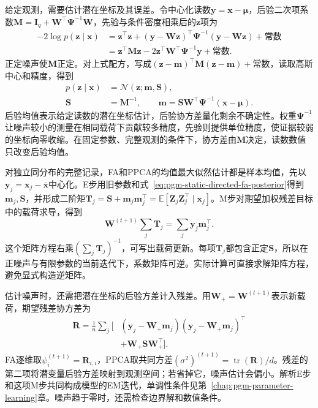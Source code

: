 给定观测，需要估计潜在坐标及其误差。令中心化读数$\bm y=\bm x-\bm\mu$，后验二次项系数$\bm M=\bm I_q+\bm W^\top\bm\Psi^{-1}\bm W$，先验与条件密度相乘后的$\bm z$项为
\[
  \begin{aligned}
    -2\log p(\bm{z}\mid\bm{x})
      &=\bm{z}^{\top}\bm{z}
       +(\bm{y}-\bm{W}\bm{z})^{\top}
          \bm{\Psi}^{-1}(\bm{y}-\bm{W}\bm{z})
       +\text{常数}\\
      &=\bm{z}^{\top}\bm{M}\bm{z}
       -2\bm{z}^{\top}\bm{W}^{\top}\bm{\Psi}^{-1}\bm{y}
       +\text{常数}.
  \end{aligned}
\]
正定噪声使$\bm M$正定。对上式配方，写成$(\bm z-\bm m)^\top\bm M(\bm z-\bm m)+\text{常数}$，读取高斯中心和精度，得到
\begin{equation}
  \label{eq:pgm-static-directed-fa-posterior}
  \begin{aligned}
    p(\bm{z}\mid\bm{x})&=\mathcal{N}(\bm{z};\bm{m},\bm{S}),\\
    \bm{S}&=\bm{M}^{-1},\qquad
    \bm{m}=\bm{S}\bm{W}^{\top}\bm{\Psi}^{-1}
                  (\bm{x}-\bm{\mu}).
  \end{aligned}
\end{equation}
后验均值表示给定读数的潜在坐标估计，后验协方差量化剩余不确定性。权重$\bm\Psi^{-1}$让噪声较小的测量在相同载荷下贡献较多精度，先验则提供单位精度，使证据较弱的坐标向零收缩。在固定参数、完整观测的条件下，协方差由$\bm M$决定，读数数值只改变后验均值。

对独立同分布的完整记录，FA和PPCA的均值最大似然估计都是样本均值，先以$\bm y_j=\bm x_j-\overline{\bm x}$中心化。E步用旧参数和式~\eqref{eq:pgm-static-directed-fa-posterior}得到$\bm m_j,\bm S$，并形成二阶矩$\bm T_j=\bm S+\bm m_j\bm m_j^\top=\mathbb E[\bm Z_j\bm Z_j^\top\mid\bm x_j]$。M步对期望加权残差目标中的载荷求导，得到
\[
  \bm{W}^{(t+1)}\sum_j\bm{T}_j
     =\sum_j\bm{y}_j\bm{m}_j^\top.
\]
这个矩阵方程右乘$\left(\sum_j\bm T_j\right)^{-1}$，可写出载荷更新。每项$\bm T_j$都包含正定$\bm S$，所以在正噪声与有限参数的当前迭代下，系数矩阵可逆。实际计算可直接求解矩阵方程，避免显式构造逆矩阵。

估计噪声时，还需把潜在坐标的后验方差计入残差。用$\bm W_+=\bm W^{(t+1)}$表示新载荷，期望残差协方差为
\begin{equation}
  \label{eq:pgm-static-directed-fa-residual}
  \begin{aligned}
    \bm{R}=\frac1n\sum_j\bigl[
      &(\bm{y}_j-\bm{W}_{+}\bm{m}_j)
       (\bm{y}_j-\bm{W}_{+}\bm{m}_j)^\top\\
      &+\bm{W}_{+}\bm{S}\bm{W}_{+}^\top
    \bigr].
  \end{aligned}
\end{equation}
FA逐维取$\psi_i^{(t+1)}=\bm R_{i,i}$，PPCA取共同方差$(\sigma^2)^{(t+1)}=\operatorname{tr}(\bm R)/d$。残差的第二项将潜变量后验方差映射到观测空间；若省掉它，噪声估计会偏小。解析E步和这项M步共同构成模型的EM迭代，单调性条件见第~\ref{chap:pgm-parameter-learning}章。噪声趋于零时，还需检查边界解和数值条件。

